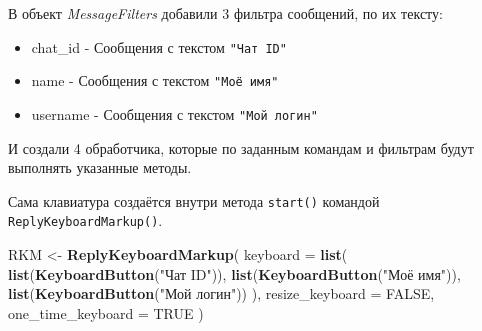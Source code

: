 \documentclass[
]{book}
\newenvironment{Shaded}{\begin{snugshade}}{\end{snugshade}}
\newcommand{\AttributeTok}[1]{\textcolor[rgb]{0.13,0.29,0.53}{#1}}
\newcommand{\CommentTok}[1]{\textcolor[rgb]{0.56,0.35,0.01}{\textit{#1}}}
\newcommand{\ConstantTok}[1]{\textcolor[rgb]{0.56,0.35,0.01}{#1}}
\newcommand{\FunctionTok}[1]{\textcolor[rgb]{0.13,0.29,0.53}{\textbf{#1}}}
\newcommand{\NormalTok}[1]{#1}
\newcommand{\OtherTok}[1]{\textcolor[rgb]{0.56,0.35,0.01}{#1}}
\newcommand{\SpecialCharTok}[1]{\textcolor[rgb]{0.81,0.36,0.00}{\textbf{#1}}}
\newcommand{\StringTok}[1]{\textcolor[rgb]{0.31,0.60,0.02}{#1}}
\providecommand{\tightlist}{%
  \setlength{\itemsep}{0pt}\setlength{\parskip}{0pt}}
\begin{document}
В объект \emph{MessageFilters} добавили 3 фильтра сообщений, по их тексту:

\begin{itemize}
\tightlist
\item
  chat\_id - Сообщения с текстом \texttt{"Чат\ ID"}
\item
  name - Сообщения с текстом \texttt{"Моё\ имя"}
\item
  username - Сообщения с текстом \texttt{"Мой\ логин"}
\end{itemize}

И создали 4 обработчика, которые по заданным командам и фильтрам будут выполнять указанные методы.

\begin{Shaded}
\end{Shaded}

Сама клавиатура создаётся внутри метода \texttt{start()} командой \texttt{ReplyKeyboardMarkup()}.

\begin{Shaded}
\begin{Highlighting}[]
\NormalTok{RKM }\OtherTok{\textless{}{-}} \FunctionTok{ReplyKeyboardMarkup}\NormalTok{(}
    \AttributeTok{keyboard =} \FunctionTok{list}\NormalTok{(}
      \FunctionTok{list}\NormalTok{(}\FunctionTok{KeyboardButton}\NormalTok{(}\StringTok{"Чат ID"}\NormalTok{)),}
      \FunctionTok{list}\NormalTok{(}\FunctionTok{KeyboardButton}\NormalTok{(}\StringTok{"Моё имя"}\NormalTok{)),}
      \FunctionTok{list}\NormalTok{(}\FunctionTok{KeyboardButton}\NormalTok{(}\StringTok{"Мой логин"}\NormalTok{))}
\NormalTok{    ),}
    \AttributeTok{resize\_keyboard =} \ConstantTok{FALSE}\NormalTok{,}
    \AttributeTok{one\_time\_keyboard =} \ConstantTok{TRUE}
\NormalTok{)}
\end{Highlighting}
\end{Shaded}
\end{document}
